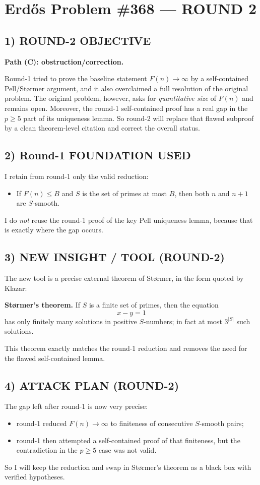 \section*{Erd\H{o}s Problem \#368 --- ROUND 2}

\subsection*{1) ROUND-2 OBJECTIVE}
\textbf{Path (C): obstruction/correction.}

Round-1 tried to prove the baseline statement $F(n)\to\infty$ by a self-contained Pell/St\o rmer argument, and it also overclaimed a full resolution of the original problem. The original problem, however, asks for \emph{quantitative size} of $F(n)$ and remains open. Moreover, the round-1 self-contained proof has a real gap in the $p\ge 5$ part of its uniqueness lemma. So round-2 will replace that flawed subproof by a clean theorem-level citation and correct the overall status.

\subsection*{2) Round-1 FOUNDATION USED}
I retain from round-1 only the valid reduction:
\begin{itemize}
\item If $F(n)\le B$ and $S$ is the set of primes at most $B$, then both $n$ and $n+1$ are $S$-smooth.
\end{itemize}
I do \emph{not} reuse the round-1 proof of the key Pell uniqueness lemma, because that is exactly where the gap occurs.

\subsection*{3) NEW INSIGHT / TOOL (ROUND-2)}
The new tool is a precise external theorem of St\o rmer, in the form quoted by Klazar:

\medskip
\noindent
\textbf{St\o rmer's theorem.} If $S$ is a finite set of primes, then the equation
\[
x-y=1
\]
has only finitely many solutions in positive $S$-numbers; in fact at most $3^{|S|}$ such solutions.
\medskip

This theorem exactly matches the round-1 reduction and removes the need for the flawed self-contained lemma.

\subsection*{4) ATTACK PLAN (ROUND-2)}
The gap left after round-1 is now very precise:
\begin{itemize}
\item round-1 reduced $F(n)\to\infty$ to finiteness of consecutive $S$-smooth pairs;
\item round-1 then attempted a self-contained proof of that finiteness, but the contradiction in the $p\ge 5$ case was not valid.
\end{itemize}
So I will keep the reduction and swap in St\o rmer's theorem as a black box with verified hypotheses.

